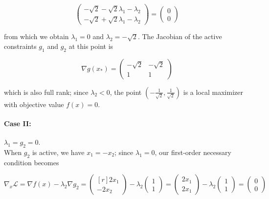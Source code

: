 \begin{solution}
    $$
    \begin{pmatrix*}
        -\sqrt{2} - \sqrt{2} \lambda_1 - \lambda_2 \\
        -\sqrt{2} + \sqrt{2} \lambda_1 - \lambda_2
    \end{pmatrix*} = \begin{pmatrix*}
        0 \\
        0
    \end{pmatrix*}
    $$

    from which we obtain $\lambda_1 = 0$ and $\lambda_2 = -\sqrt{2}$. The Jacobian of the active constraints $g_1$ 
    and $g_2$ at this point is 

    $$
    \nabla g(x_*) = \begin{pmatrix*}
        -\sqrt{2} & -\sqrt{2} \\
        1         & 1
    \end{pmatrix*}
    $$

    which is also full rank; since $\lambda_2 < 0$, the point $\left( -\frac{1}{\sqrt{2}}, \frac{1}{\sqrt{2}} \right)$
    is a local maximizer with objective value $f(x) = 0$.
    
    \paragraph{Case II:} $\lambda_1 = g_2 = 0.$ \ \\

    When $g_2$ is active, we have $x_1 = -x_2$; since $\lambda_1 = 0$, our first-order necessary condition becomes

    $$
    \nabla_x \mathcal{L} = \nabla f(x) - \lambda_2 \nabla g_2 = \begin{pmatrix*}[r]
        2 x_1 \\
       -2 x_2
    \end{pmatrix*} - \lambda_2 \begin{pmatrix*}
        1 \\
        1
    \end{pmatrix*} = \begin{pmatrix*}
        2 x_1 \\
        2 x_1
    \end{pmatrix*} - \lambda_2 \begin{pmatrix*}
        1 \\
        1
    \end{pmatrix*} = \begin{pmatrix*}
        0 \\
        0
    \end{pmatrix*}
    $$


\end{solution}
